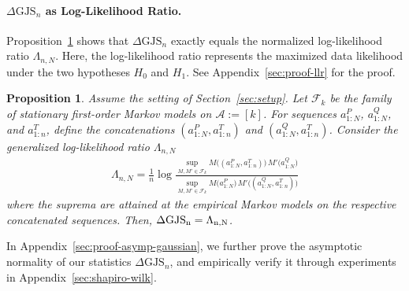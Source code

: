 \documentclass{article}
\theoremstyle{plain}
\newtheorem{proposition}[theorem]{Proposition}
\theoremstyle{definition}
\theoremstyle{remark}
\begin{document}
\paragraph{$\Delta \text{GJS}_n$ as Log-Likelihood Ratio.} Proposition~\ref{prop:GJS-n-as-LLR} shows that $\Delta \text{GJS}_n$ exactly equals the normalized log-likelihood ratio $\Lambda_{n,N}$. Here, the log-likelihood ratio represents the maximized data likelihood under the two hypotheses $H_0$ and $H_1$. See Appendix~\ref{sec:proof-llr} for the proof.

\begin{proposition}\label{prop:GJS-n-as-LLR}
     Assume the setting of Section~\ref{sec:setup}. Let $\mathcal{F}_k$ be the family of stationary first-order Markov models on $\mathcal{A}:=[k]$. For sequences $a^P_{1:N}$, $a^Q_{1:N}$, and $a^T_{1:n}$, define the concatenations $(a^P_{1:N},a^T_{1:n})$ and $(a^Q_{1:N},a^T_{1:n})$.  Consider the generalized log-likelihood ratio $ \Lambda_{n,N}$
     \begin{align}
      \Lambda_{n,N} =   \frac{1}{n}\log\!
\frac{\displaystyle \sup_{M,M'\in\mathcal{F}_k}
M\!\bigl((a^P_{1:N},a^T_{1:n})\bigr)\,M'\!\bigl(a^Q_{1:N}\bigr)}
{\displaystyle \sup_{M,M'\in\mathcal{F}_k}
M\!\bigl(a^P_{1:N}\bigr)\,M'\!\bigl((a^Q_{1:N},a^T_{1:n})\bigr)}
     \end{align}
     where the suprema are attained at the empirical Markov models on the respective concatenated sequences. Then,
         $\Delta \rm{GJS}_n =  \Lambda_{n,N}$.

\end{proposition}
In Appendix~\ref{sec:proof-asymp-gaussian}, we further prove the asymptotic normality of our statistics $\Delta \text{GJS}_n$, and empirically verify it through experiments in Appendix~\ref{sec:shapiro-wilk}.
\end{document}
